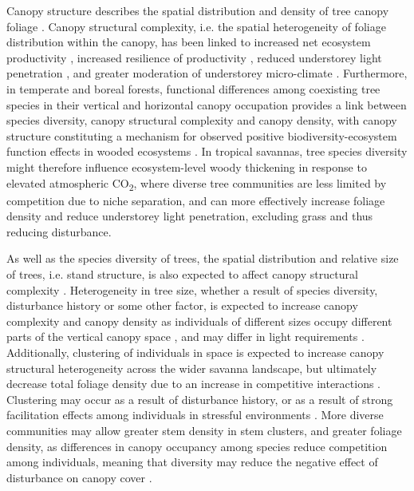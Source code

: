 \documentclass[11pt,a4paper]{article}
\begin{document}
Canopy structure describes the spatial distribution and density of tree canopy foliage \citep{Lowman2004}. Canopy structural complexity, i.e. the spatial heterogeneity of foliage distribution within the canopy, has been linked to increased net ecosystem productivity \citep{Hardiman2011,Chen2012,Law2001,Baldocchi2001,Morin2015}, increased resilience of productivity \citep{Pretzsch2014}, reduced understorey light penetration \citep{Scheuermann2018, Fotis2018}, and greater moderation of understorey micro-climate \citep{Wright2017}. Furthermore, in temperate and boreal forests, functional differences among coexisting tree species in their vertical and horizontal canopy occupation provides a link between species diversity, canopy structural complexity and canopy density, with canopy structure constituting a mechanism for observed positive biodiversity-ecosystem function effects in wooded ecosystems \citep{Pretzsch2014, Barry2019}. In tropical savannas, tree species diversity might therefore influence ecosystem-level woody thickening in response to elevated atmospheric CO\textsubscript{2}, where diverse tree communities are less limited by competition due to niche separation, and can more effectively increase foliage density and reduce understorey light penetration, excluding grass and thus reducing disturbance. 

As well as the species diversity of trees, the spatial distribution and relative size of trees, i.e. stand structure, is also expected to affect canopy structural complexity \citep{Stark2015}. Heterogeneity in tree size, whether a result of species diversity, disturbance history or some other factor, is expected to increase canopy complexity and canopy density as individuals of different sizes occupy different parts of the vertical canopy space \citep{Panzou2020}, and may differ in light requirements \citep{CharlesDominique2018}. Additionally, clustering of individuals in space is expected to increase canopy structural heterogeneity across the wider savanna landscape, but ultimately decrease total foliage density due to an increase in competitive interactions \citep{Dohn2017}. Clustering may occur as a result of disturbance history, or as a result of strong facilitation effects among individuals in stressful environments \citep{Ratcliffe2017}. More diverse communities may allow greater stem density in stem clusters, and greater foliage density, as differences in canopy occupancy among species reduce competition among individuals, meaning that diversity may reduce the negative effect of disturbance on canopy cover \citep{Gough2019}.
\end{document}
